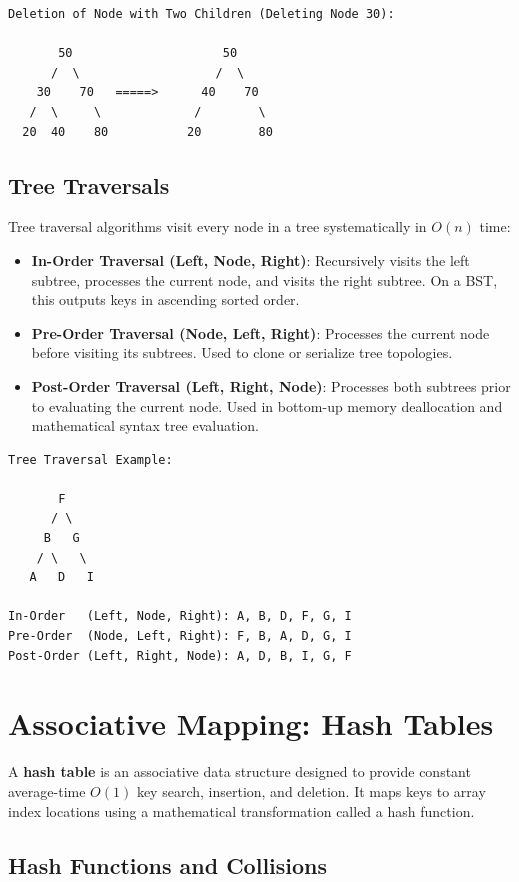 \documentclass[12pt]{report}
\begin{document}
\begin{verbatim}
Deletion of Node with Two Children (Deleting Node 30):

       50                     50
      /  \                   /  \
    30    70   =====>      40    70
   /  \     \             /        \
  20  40    80           20        80
\end{verbatim}

\subsection{Tree Traversals}

Tree traversal algorithms visit every node in a tree systematically in $O(n)$ time:
\begin{itemize}
    \item \textbf{In-Order Traversal (Left, Node, Right)}: Recursively visits the left subtree, processes the current node, and visits the right subtree. On a BST, this outputs keys in ascending sorted order.
    \item \textbf{Pre-Order Traversal (Node, Left, Right)}: Processes the current node before visiting its subtrees. Used to clone or serialize tree topologies.
    \item \textbf{Post-Order Traversal (Left, Right, Node)}: Processes both subtrees prior to evaluating the current node. Used in bottom-up memory deallocation and mathematical syntax tree evaluation.
\end{itemize}

\begin{verbatim}
Tree Traversal Example:

       F
      / \
     B   G
    / \   \
   A   D   I

In-Order   (Left, Node, Right): A, B, D, F, G, I
Pre-Order  (Node, Left, Right): F, B, A, D, G, I
Post-Order (Left, Right, Node): A, D, B, I, G, F
\end{verbatim}

\section{Associative Mapping: Hash Tables}

A \textbf{hash table} is an associative data structure designed to provide constant average-time $O(1)$ key search, insertion, and deletion. It maps keys to array index locations using a mathematical transformation called a hash function.

\subsection{Hash Functions and Collisions}
\end{document}
